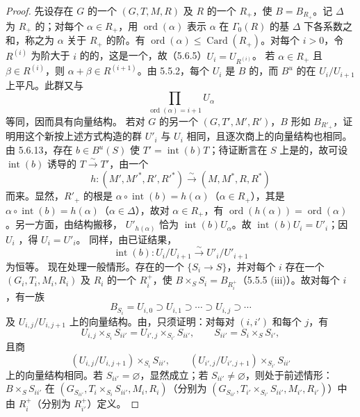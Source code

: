 \begin{proof}
先设存在 $G$ 的一个 $(G,T,M,R)$ 及 $R$ 的一个 $R_+$，使 $B=B_{R_+}$。记 $\Delta$ 为 $R_+$ 的；对每个 $\alpha\in R_+$，用 $\operatorname{ord}(\alpha)$ 表示 $\alpha$ 在 $\Gamma_0(R)$ 的基 $\Delta$ 下各系数之和，称之为 $\alpha$ 关于 $R_+$ 的阶。有 $\operatorname{ord}(\alpha)\le\operatorname{Card}(R_+)$。对每个 $i>0$，令 $R^{(i)}$ 为阶大于 $i$ 的的，这是一个，故（5.6.5）$U_i=U_{R^{(i)}}$。
若 $\alpha\in R_+$ 且 $\beta\in R^{(i)}$，则 $\alpha+\beta\in R^{(i+1)}$。由 5.5.2，每个 $U_i$ 是 $B$ 的，而 $B^u$ 的在 $U_i/U_{i+1}$ 上平凡。此群又与
\[\prod_{\operatorname{ord}(\alpha)=i+1}U_\alpha\]
等同，因而具有向量结构。
若对 $G$ 的另一个 $(G,T',M',R')$，$B$ 形如 $B_{R'_+}$，证明用这个新按上述方式构造的群 $U'_i$ 与 $U_i$ 相同，且逐次商上的向量结构也相同。由 5.6.13，存在 $b\in B^u(S)$ 使 $T'=\operatorname{int}(b)T$；待证断言在 $S$ 上是的，故可设 $\operatorname{int}(b)$ 诱导的 $T\xrightarrow\sim T'$，由一个
\[h:(M',M'^*,R',R'^*)\xrightarrow\sim(M,M^*,R,R^*)\]
而来。显然，$R'_+$ 的根是 $\alpha\circ\operatorname{int}(b)=h(\alpha)$（$\alpha\in R_+$），其是 $\alpha\circ\operatorname{int}(b)=h(\alpha)$（$\alpha\in\Delta$），故对 $\alpha\in R_+$，有 $\operatorname{ord}(h(\alpha))=\operatorname{ord}(\alpha)$。另一方面，由结构搬移， $U'_{h(\alpha)}$ 恰为 $\operatorname{int}(b)U_\alpha$。故 $\operatorname{int}(b)U_i=U'_i$；因 $U_i$ ，得 $U_i=U'_i$。
同样，由已证结果，
\[\operatorname{int}(b):U_i/U_{i+1}\xrightarrow\sim U'_i/U'_{i+1}\]
为恒等。
现在处理一般情形。存在的一个 $\{S_i\to S\}$，并对每个 $i$ 存在一个 $(G_i,T_i,M_i,R_i)$ 及 $R_i$ 的一个 $R_i^+$，使 $B\times_SS_i=B_{R_i^+}$（5.5.5 (iii)）。故对每个 $i$，有一族
\[B_{S_i}=U_{i,0}\supset U_{i,1}\supset\cdots\supset U_{i,j}\supset\cdots\]
及 $U_{i,j}/U_{i,j+1}$ 上的向量结构。由，只须证明：对每对 $(i,i')$ 和每个 $j$，有
\[U_{i,j}\times_{S_i}S_{ii'}=U_{i',j}\times_{S_{i'}}S_{ii'},\qquad S_{ii'}=S_i\times_SS_{i'},\]
且商
\[(U_{i,j}/U_{i,j+1})\times_{S_i}S_{ii'},\qquad
(U_{i',j}/U_{i',j+1})\times_{S_{i'}}S_{ii'}\]
上的向量结构相同。若 $S_{ii'}=\varnothing$，显然成立；若 $S_{ii'}\ne\varnothing$，则处于前述情形：$B\times_SS_{ii'}$ 在 $(G_{S_{ii'}},T_i\times_{S_i}S_{ii'},M_i,R_i)$（分别为 $(G_{S_{ii'}},T_{i'}\times_{S_{i'}}S_{ii'},M_{i'},R_{i'})$）中由 $R_i^+$（分别为 $R_{i'}^+$）定义。
\end{proof}

